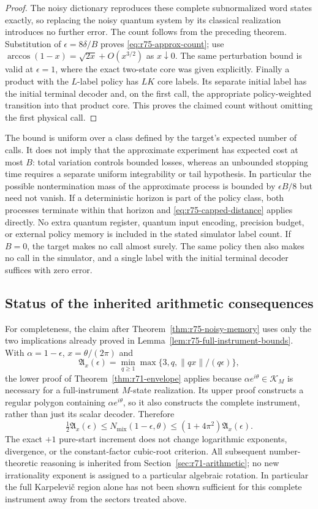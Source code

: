 \begin{proof}
The noisy dictionary reproduces these complete subnormalized word states
exactly, so replacing the noisy quantum system by its classical
realization introduces no further error.  The count follows from the
preceding theorem.  Substitution of $\epsilon=8\delta/B$ proves
\eqref{eq:r75-approx-count}; use
$\arccos(1-x)=\sqrt{2x}+O(x^{3/2})$ as $x\downarrow0$.
The same perturbation bound is valid at $\epsilon=1$, where the exact
two-state core was given explicitly.  Finally a product with the
$L$-label policy has $LK$ core labels.  Its separate initial label has
the initial terminal decoder and, on the first call, the appropriate
policy-weighted transition into that product core.  This proves the
claimed count without omitting the first physical call.
\end{proof}

The bound is uniform over a class defined by the target's expected number
of calls.  It does not imply that the approximate experiment has expected
cost at most $B$: total variation controls bounded losses, whereas an
unbounded stopping time requires a separate uniform integrability or
tail hypothesis.  In particular the possible nontermination mass of the
approximate process is bounded by $\epsilon B/8$ but need not vanish.
If a deterministic horizon is part of the policy class, both processes
terminate within that horizon and \eqref{eq:r75-capped-distance} applies
directly.  No extra quantum register, quantum input encoding, precision
budget, or external policy memory is included in the stated simulator
label count.
If $B=0$, the target makes no call almost surely.  The same policy then
also makes no call in the simulator, and a single label with the initial
terminal decoder suffices with zero error.

\subsection{Status of the inherited arithmetic consequences}
\label{sec:r75-arithmetic-lift}

For completeness, the claim after Theorem~\ref{thm:r75-noisy-memory}
uses only the two implications already proved in
Lemma~\ref{lem:r75-full-instrument-bounds}.  With
$\alpha=1-\epsilon$, $x=\theta/(2\pi)$ and
\[
 \mathfrak A_x(\epsilon)
   =\min_{q\ge1}\max\{3,q,\|qx\|/(q\epsilon)\},
\]
the lower proof of Theorem~\ref{thm:r71-envelope} applies because
$\alpha e^{i\theta}\in\mathcal K_M$ is necessary for a full-instrument
$M$-state realization.  Its upper proof constructs a regular polygon
containing $\alpha e^{i\theta}$, so it also constructs the complete
instrument, rather than just its scalar decoder.  Therefore
\[
 \tfrac12\mathfrak A_x(\epsilon)
 \le N_{\mathrm{mix}}(1-\epsilon,\theta)
 \le (1+4\pi^2)\mathfrak A_x(\epsilon).
\]
The exact $+1$ pure-start increment does not change logarithmic
exponents, divergence, or the constant-factor cubic-root criterion.
All subsequent number-theoretic reasoning is inherited from
Section~\ref{sec:r71-arithmetic}; no new irrationality exponent is
assigned to a particular algebraic rotation.  In particular the full
Karpelevi\v c region alone has not been shown sufficient for this complete
instrument away from the sectors treated above.
